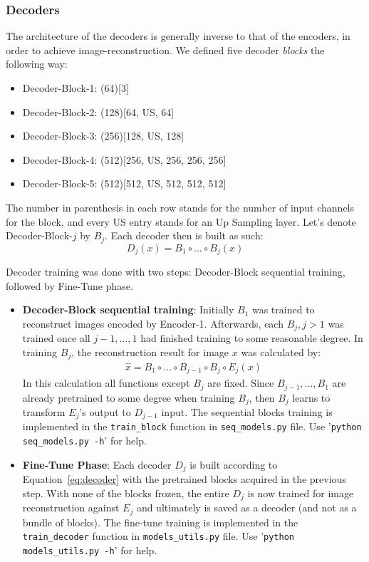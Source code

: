 \subsubsection{Decoders}
The architecture of the decoders is generally inverse to that of the encoders, in order to achieve image-reconstruction. We defined five decoder \textit{blocks} the following way:
\begin{itemize}
	\item Decoder-Block-1: (64)[3]
	\item Decoder-Block-2: (128)[64, US, 64]
	\item Decoder-Block-3: (256)[128, US, 128]
	\item Decoder-Block-4: (512)[256, US, 256, 256, 256]
	\item Decoder-Block-5: (512)[512, US, 512, 512, 512]
\end{itemize}
The number in parenthesis in each row stands for the number of input channels for the block, and every US entry stands for an Up Sampling layer. Let's denote Decoder-Block-$j$ by $B_j$. Each decoder then is built as such:
\begin{equation}\label{eq:decoder}
D_j(x) = B_1 \circ \dots \circ B_j (x)
\end{equation}

Decoder training was done with two steps: Decoder-Block sequential training, followed by Fine-Tune phase.
\begin{itemize}
	\item \textbf{Decoder-Block sequential training}: Initially $B_1$ was trained to reconstruct images encoded by Encoder-1. Afterwards, each $B_j, j>1$ was trained once all $j-1,\dots,1$ had finished training to some reasonable degree. In training $B_j$, the reconstruction result for image $x$ was calculated by:
	\begin{gather*}
	\hat{x} = B_1 \circ \dots \circ B_{j-1} \circ B_j \circ E_j (x)
	\end{gather*}
	In this calculation all functions except $B_j$ are fixed. Since $B_{j-1}, \dots, B_1$ are already pretrained to some degree when training $B_j$, then $B_j$ learns to transform $E_j$'s output to $D_{j-1}$ input. The sequential blocks training is implemented in the \texttt{train\_block} function in \texttt{seq\_models.py} file. Use '\texttt{python seq\_models.py -h}' for help.
	
	\item \textbf{Fine-Tune Phase}: Each decoder $D_j$ is built according to Equation~\ref*{eq:decoder} with the pretrained blocks acquired in the previous step. With none of the blocks frozen, the entire $D_j$ is now trained for image reconstruction against $E_j$ and ultimately is saved as a decoder (and not as a bundle of blocks). The fine-tune training is implemented in the \texttt{train\_decoder} function in \texttt{models\_utils.py} file. Use '\texttt{python models\_utils.py -h}' for help.
\end{itemize}

